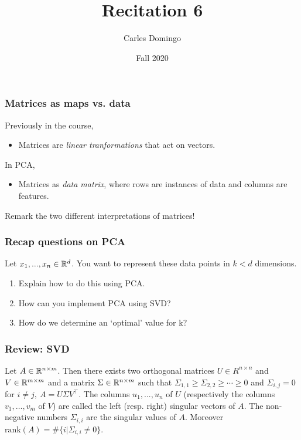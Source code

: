 \documentclass{beamer}
\title{Recitation 6}
\author{Carles Domingo}
\date{Fall 2020}
\begin{document}
\frame{\titlepage} 

\setcounter{showProgressBar}{0}
\setcounter{showSlideNumbers}{1}

\begin{frame}[t]
\frametitle{Matrices as maps vs. data}
Previously in the course,
\begin{itemize}
\item Matrices are \textit{linear tranformations} that act on vectors.
\end{itemize}
In PCA,
\begin{itemize}
\item Matrices as \textit{data matrix}, where rows are instances of data and columns are features.
\end{itemize}
Remark the two different interpretations of matrices!
\end{frame}

\begin{frame}[t]
\frametitle{Recap questions on PCA}
\vspace{-5pt}
Let $x_1,...,x_n\in\mathbb{R}^d$. You want to represent these data points in $k < d$ dimensions.
\begin{enumerate}
\item Explain how to do this using PCA.
\item How can you implement PCA using SVD?
\item How do we determine an `optimal' value for k?
\pause
\pause
\pause
\end{enumerate}
\end{frame}

\begin{frame}[t]
\frametitle{Review: SVD}
\begin{theorem}
Let $A \in \mathbb{R}^{n \times m}$. Then there exists two orthogonal matrices $U \in R^{n \times n}$ and $V \in \mathbb{R}^{m \times m}$ and a
matrix $\Sigma \in \mathbb{R}^{n \times m}$ such that $\Sigma_{1,1} \geq \Sigma_{2,2} \geq \cdots \geq 0$ and $\Sigma_{i,j} =0$ for $i \neq j, \ A = U \Sigma V^{\top}$.
The columns $u_1,...,u_n$ of $U$ (respectively the columns $v_1, \dots, v_m$ of $V$) are called the left (resp. right) singular vectors of $A$. The non-negative numbers $\Sigma_{i,i}$ are the singular values of $A$. Moreover $\text{rank}(A) = \#\{i | \Sigma_{i,i} \neq 0\}$.
\end{theorem}
\end{frame}
\end{document}
